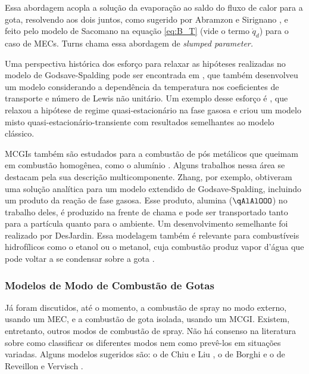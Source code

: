 Essa abordagem acopla a solução da evaporação ao saldo do fluxo de calor para a gota, resolvendo aos dois juntos, como sugerido por Abramzon e Sirignano \cite{Sirignano1989}, e feito pelo modelo de Sacomano\etal \cite{SacomanoF2022IJHMT} na equação \eqref{eq:B_T} (vide o termo $\dot q_d$) para o caso de MECs.
Turns \cite{Turns2000} chama essa abordagem de \emph{slumped parameter.}

Uma perspectiva histórica dos esforço para relaxar as hipóteses realizadas no modelo de Godsave-Spalding pode ser encontrada em \cite{FachiniF1999}, que também desenvolveu um modelo considerando a dependência da temperatura nos coeficientes de transporte e número de Lewis não unitário.
Um exemplo desse esforço é \cite{UlzamaS2007}, que relaxou a hipótese de regime quasi-estacionário na fase gasosa e criou um modelo misto quasi-estacionário-transiente com resultados semelhantes ao modelo clássico.

MCGIs também são estudados para a combustão de pós metálicos que queimam em combustão homogênea, como o alumínio \cite[p. 7]{Bergthorson2015}.
Alguns trabalhos nessa área se destacam pela sua descrição multicomponente. 
Zhang\etal \cite{Zhang2022_Coflow,Zhang2022_Counterflow}, por exemplo, obtiveram uma solução analítica para um modelo extendido de Godsave-Spalding, incluindo um produto da reação de fase gasosa.
Esse produto, alumina ($\qAlAlOOO$) no trabalho deles, é produzido na frente de chama e pode ser transportado tanto para a partícula quanto para o ambiente.
Um desenvolvimento semelhante foi realizado por DesJardin\etal \cite{DesJardin2005}.
Essa modelagem também é relevante para combustíveis hidrofílicos como o etanol ou o metanol, cuja combustão produz vapor d'água que pode voltar a se condensar sobre a  gota \cite{SacomanoF2024CF,SacomanoF2025CF}.



\subsubsection{Modelos de Modo de Combustão de Gotas}

Já foram discutidos, até o momento, a combustão de spray no modo externo, usando um MEC, e a combustão de gota isolada, usando um MCGI.
Existem, entretanto, outros modos de combustão de spray.
Não há consenso na literatura sobre como classificar os diferentes modos nem como prevê-los em situações variadas.
Alguns modelos sugeridos são: o de Chiu e Liu \cite{ChiuH1977,ChiuH1982}, o de Borghi \cite{Borghi1996} e o de Reveillon e Vervisch \cite{ReveillonJ2005}.


